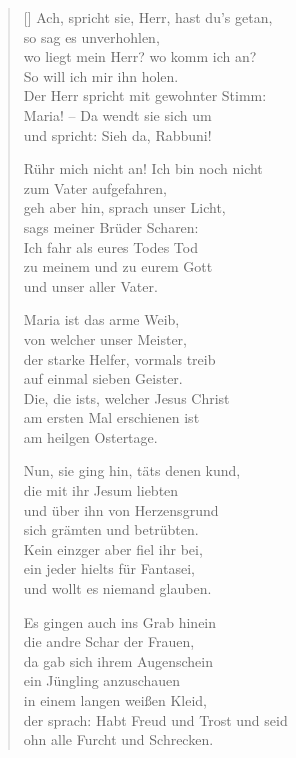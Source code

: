 \begin{multicols}{2}
\begin{verse}[\versewidth]
 Ach, spricht sie, Herr, hast du's getan,\\
so sag es unverhohlen,\\
wo liegt mein Herr? wo komm ich an?\\
So will ich mir ihn holen.\\
Der Herr spricht mit gewohnter Stimm:\\
Maria! – Da wendt sie sich um\\
und spricht: Sieh da, Rabbuni!

 Rühr mich nicht an! Ich bin noch nicht\\
zum Vater aufgefahren,\\
geh aber hin, sprach unser Licht,\\
sags meiner Brüder Scharen:\\
Ich fahr als eures Todes Tod\\
zu meinem und zu eurem Gott\\
und unser aller Vater.

 Maria ist das arme Weib,\\
von welcher unser Meister,\\
der starke Helfer, vormals treib\\
auf einmal sieben Geister.\\
Die, die ists, welcher Jesus Christ\\
am ersten Mal erschienen ist\\
am heilgen Ostertage.

\vfill\null
\columnbreak
 
 Nun, sie ging hin, täts denen kund,\\
die mit ihr Jesum liebten\\
und über ihn von Herzensgrund\\
sich grämten und betrübten.\\
Kein einzger aber fiel ihr bei,\\
ein jeder hielts für Fantasei,\\
und wollt es niemand glauben.

 Es gingen auch ins Grab hinein\\
die andre Schar der Frauen,\\
da gab sich ihrem Augenschein\\
ein Jüngling anzuschauen\\
in einem langen weißen Kleid,\\
der sprach: Habt Freud und Trost und seid\\
ohn alle Furcht und Schrecken.


\end{verse}
\end{multicols}

